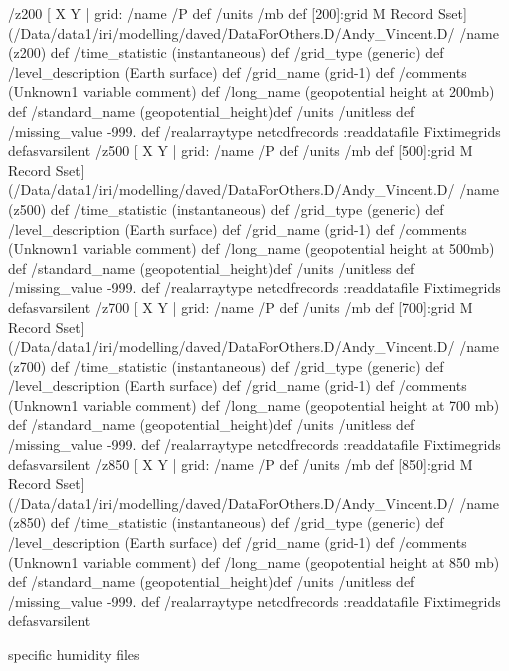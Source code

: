 \begin{ingrid}
/z200{
[  X Y | grid:
       /name /P def
       /units /mb def
       [200]:grid M Record Sset] (/Data/data1/iri/modelling/daved/DataForOthers.D/Andy_Vincent.D/%
/name (z200) def
 /time_statistic (instantaneous) def
 /grid_type (generic) def
 /level_description (Earth surface) def
 /grid_name (grid-1) def
 /comments (Unknown1 variable comment) def
 /long_name (geopotential height at 200mb) def
/standard_name (geopotential_height)def
 /units /unitless def
 /missing_value -999. def
 /realarraytype netcdfrecords :readdatafile Fixtimegrids
}defasvarsilent
 /z500{
[  X Y | grid:
       /name /P def
       /units /mb def
       [500]:grid  M Record Sset] (/Data/data1/iri/modelling/daved/DataForOthers.D/Andy_Vincent.D/%
/name (z500) def
 /time_statistic (instantaneous) def
 /grid_type (generic) def
 /level_description (Earth surface) def
 /grid_name (grid-1) def
 /comments (Unknown1 variable comment) def
 /long_name (geopotential height at 500mb) def
/standard_name (geopotential_height)def
 /units /unitless def
 /missing_value -999. def
 /realarraytype netcdfrecords :readdatafile Fixtimegrids
}defasvarsilent
 /z700{
[  X Y | grid:
       /name /P def
       /units /mb def
       [700]:grid M Record Sset] (/Data/data1/iri/modelling/daved/DataForOthers.D/Andy_Vincent.D/%
/name (z700) def
 /time_statistic (instantaneous) def
 /grid_type (generic) def
 /level_description (Earth surface) def
 /grid_name (grid-1) def
 /comments (Unknown1 variable comment) def
 /long_name (geopotential height at 700 mb) def
/standard_name (geopotential_height)def
 /units /unitless def
 /missing_value -999. def
 /realarraytype netcdfrecords :readdatafile Fixtimegrids
}defasvarsilent
 /z850{
[  X Y | grid:
       /name /P def
       /units /mb def
       [850]:grid M Record Sset] (/Data/data1/iri/modelling/daved/DataForOthers.D/Andy_Vincent.D/%
/name (z850) def
 /time_statistic (instantaneous) def
 /grid_type (generic) def
 /level_description (Earth surface) def
 /grid_name (grid-1) def
 /comments (Unknown1 variable comment) def
 /long_name (geopotential height at 850 mb) def
/standard_name (geopotential_height)def
 /units /unitless def
 /missing_value -999. def
 /realarraytype netcdfrecords :readdatafile Fixtimegrids
}defasvarsilent
\end{ingrid}
specific humidity files
